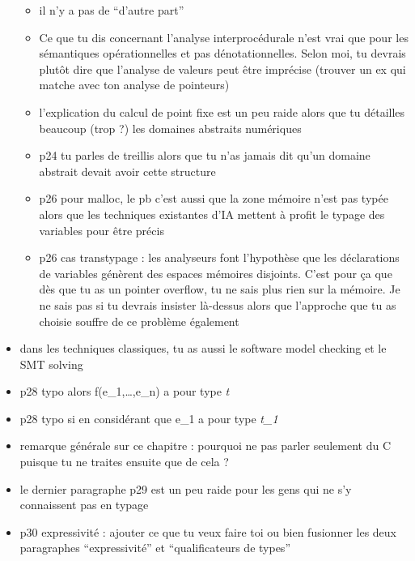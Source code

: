 \begin{itemize}
  \begin{itemize}
  \item
    il n'y a pas de ``d'autre part''
  \item
    Ce que tu dis concernant l'analyse interprocédurale n'est vrai que
    pour les sémantiques opérationnelles et pas dénotationnelles. Selon
    moi, tu devrais plutôt dire que l'analyse de valeurs peut être
    imprécise (trouver un ex qui matche avec ton analyse de pointeurs)
  \item
    l'explication du calcul de point fixe est un peu raide alors que tu
    détailles beaucoup (trop ?) les domaines abstraits numériques
  \item
    p24 tu parles de treillis alors que tu n'as jamais dit qu'un domaine
    abstrait devait avoir cette structure
  \item
    p26 pour malloc, le pb c'est aussi que la zone mémoire n'est pas
    typée alors que les techniques existantes d'IA mettent à profit le
    typage des variables pour être précis
  \item
    p26 cas transtypage : les analyseurs font l'hypothèse que les
    déclarations de variables génèrent des espaces mémoires disjoints.
    C'est pour ça que dès que tu as un pointer overflow, tu ne sais plus
    rien sur la mémoire. Je ne sais pas si tu devrais insister là-dessus
    alors que l'approche que tu as choisie souffre de ce problème
    également
  \end{itemize}
\item
  dans les techniques classiques, tu as aussi le software model checking
  et le SMT solving
\item
  p28 typo alors f(e\_1,\ldots{},e\_n) a pour type \emph{t}
\item
  p28 typo si en considérant que e\_1 a pour type \emph{t\_1}
\item
  remarque générale sur ce chapitre : pourquoi ne pas parler seulement
  du C puisque tu ne traites ensuite que de cela ?
\item
  le dernier paragraphe p29 est un peu raide pour les gens qui ne s'y
  connaissent pas en typage
\item
  p30 expressivité : ajouter ce que tu veux faire toi ou bien fusionner
  les deux paragraphes ``expressivité'' et ``qualificateurs de types''
\end{itemize}


